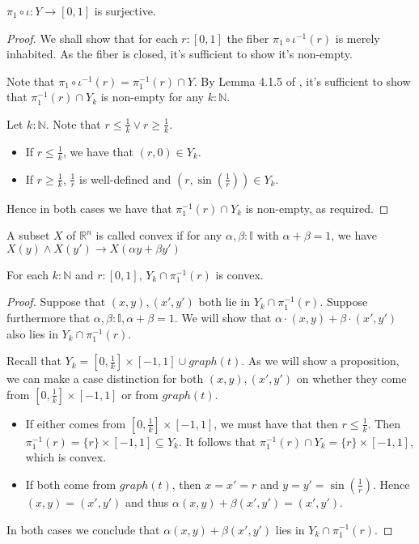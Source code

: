 \documentclass{../util/zariski}
\begin{document}
\begin{lemma}
  $\pi_1\circ \iota : Y \to [0,1]$ is surjective.  
\end{lemma}
\begin{proof}
  We shall show that for each $r:[0,1]$ the fiber $\pi_1\circ \iota^{-1}(r)$ is merely inhabited. 
  As the fiber is closed, it's sufficient to show it's non-empty. 

  Note that $\pi_1\circ \iota^{-1}(r)= \pi_1^{-1}(r) \cap Y$. 
  By Lemma 4.1.5 of \cite{synthetic-stone-duality}, 
  it's sufficient to show that $\pi_1^{-1}(r) \cap Y_k$ 
  is non-empty for any $k:\mathbb N$. 

  Let $k:\mathbb N$. 
  Note that $r\leq \frac1k \vee r \geq \frac 1k$. 
  \begin{itemize}
    \item If $r\leq \frac1k$, we have that $(r,0) \in Y_k$. 
    \item If $r\geq \frac1k$, $\frac1r$ is well-defined and 
      $(r,\sin(\frac1r)) \in Y_k$. 
  \end{itemize}
  Hence in both cases we have that $\pi_1^{-1}(r) \cap Y_k$ is non-empty, as required. 
\end{proof}

\begin{definition}
  A subset $X$ of $\mathbb R^n$ is called convex if 
  for any $\alpha,\beta:\mathbb I$ with $\alpha + \beta = 1$, we have 
  $X(y) \wedge X(y') \to X(\alpha y + \beta y')$
\end{definition}
\begin{lemma}
  For each $k:\mathbb N$ and $r:[0,1]$, $Y_k\cap \pi_1^{-1}(r)$ is convex. 
\end{lemma}
\begin{proof}
  Suppose that $(x,y), (x',y')$ both lie in $Y_k\cap \pi_1^{-1}(r)$. 
  Suppose furthermore that $\alpha,\beta:\mathbb I, \alpha+ \beta = 1$. 
  We will show that $\alpha\cdot (x,y) + \beta\cdot (x',y') $ also lies in 
  $Y_k \cap \pi_1^{-1}(r)$. 

  Recall that 
  $Y_k = [0,\frac1k] \times [-1,1]  \cup graph(t)$. 
  As we will show a proposition, we can make a case distinction 
  for both $(x,y), (x',y')$ on whether they come from $[0,\frac 1k] \times [-1,1]$ or 
  from $graph(t)$.
  \begin{itemize}
    \item 
      If either comes from $[0,\frac1k] \times [-1,1]$, we must have that 
      then $r \leq \frac1k$. 
      Then $\pi_1^{-1}(r) = \{r\} \times [-1,1]\subseteq Y_k$. 
      It follows that $\pi_1^{-1}(r) \cap Y_k = \{r\} \times [-1, 1]$, which is convex. 
    \item 
      If both come from $graph(t)$, 
      then $x = x' = r$ and $y = y' = \sin(\frac1r)$. 
      Hence $(x,y) = (x',y')$ and thus $\alpha(x,y) + \beta(x',y') = (x',y')$. 
  \end{itemize}
  In both cases we conclude that $\alpha (x,y) + \beta(x',y')$ lies in 
  $Y_k\cap \pi_1^{-1}(r)$. 
\end{proof}
\end{document}
